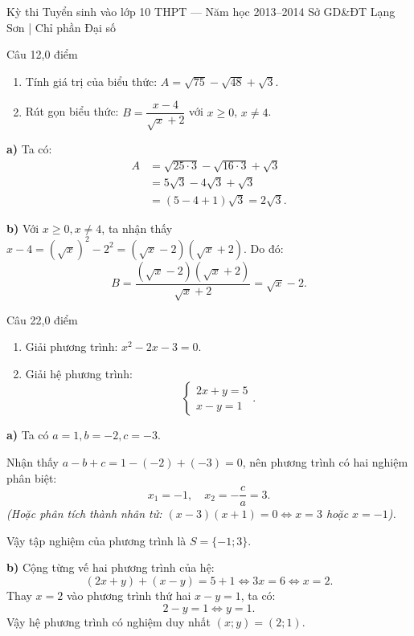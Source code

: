 ﻿%
%
  {Kỳ thi Tuyển sinh vào lớp 10 THPT — Năm học 2013--2014}%
  {Sở GD\&ĐT Lạng Sơn | Chỉ phần Đại số}

\begin{de_cau}{Câu 1}{2,0 điểm}
\begin{enumerate}[label=\alph*)]
  \item Tính giá trị của biểu thức: $A = \sqrt{75} - \sqrt{48} + \sqrt{3}$.
  \item Rút gọn biểu thức: $B = \dfrac{x-4}{\sqrt{x}+2}$ với $x \ge 0$, $x \neq 4$.
\end{enumerate}
\end{de_cau}

\begin{loi_giai_cau}
\textbf{a)} Ta có:
\begin{align*}
A &= \sqrt{25\cdot 3} - \sqrt{16\cdot 3} + \sqrt{3} \\
  &= 5\sqrt{3} - 4\sqrt{3} + \sqrt{3} \\
  &= (5 - 4 + 1)\sqrt{3} = \boxed{2\sqrt{3}}.
\end{align*}

\textbf{b)} Với $x \ge 0, x \neq 4$, ta nhận thấy $x - 4 = (\sqrt{x})^2 - 2^2 = (\sqrt{x}-2)(\sqrt{x}+2)$. Do đó:
\[B = \dfrac{(\sqrt{x}-2)(\sqrt{x}+2)}{\sqrt{x}+2} = \boxed{\sqrt{x}-2}.\]
\end{loi_giai_cau}

\begin{de_cau}{Câu 2}{2,0 điểm}
\begin{enumerate}[label=\alph*)]
  \item Giải phương trình: $x^2 - 2x - 3 = 0$.
  \item Giải hệ phương trình:
  \[\begin{cases} 2x + y = 5 \\ x - y = 1 \end{cases}.\]
\end{enumerate}
\end{de_cau}

\begin{loi_giai_cau}
\textbf{a)} Ta có $a = 1, b = -2, c = -3$.

Nhận thấy $a - b + c = 1 - (-2) + (-3) = 0$, nên phương trình có hai nghiệm phân biệt:
\[x_1 = -1, \quad x_2 = -\dfrac{c}{a} = 3.\]
\textit{(Hoặc phân tích thành nhân tử: $(x - 3)(x + 1) = 0 \Leftrightarrow x = 3$ hoặc $x = -1$).}

Vậy tập nghiệm của phương trình là $S = \{-1; 3\}$.

\textbf{b)} Cộng từng vế hai phương trình của hệ:
\[(2x + y) + (x - y) = 5 + 1 \Leftrightarrow 3x = 6 \Leftrightarrow x = 2.\]
Thay $x = 2$ vào phương trình thứ hai $x - y = 1$, ta có:
\[2 - y = 1 \Leftrightarrow y = 1.\]
Vậy hệ phương trình có nghiệm duy nhất $\boxed{(x; y) = (2; 1)}$.
\end{loi_giai_cau}

